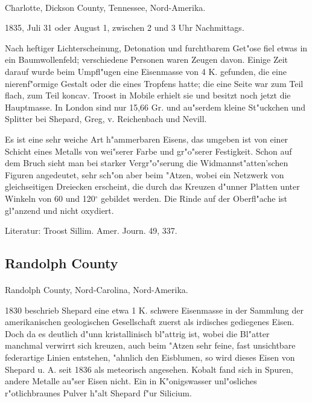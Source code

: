 \documentclass[a4paper, 11pt, oneside]{article}
\begin{document}
\paragraph{}
Charlotte, Dickson County, Tennessee, Nord-Amerika.

1835, Juli 31 oder August 1, zwischen 2 und 3 Uhr Nachmittags.

Nach heftiger Lichterscheinung, Detonation und furchtbarem Get"ose fiel etwas in ein Baumwollenfeld; verschiedene Personen waren Zeugen davon. Einige Zeit darauf wurde beim Umpfl"ugen eine Eisenmasse von 4 K. gefunden, die eine nierenf"ormige Gestalt oder die eines Tropfens hatte; die eine Seite war zum Teil flach, zum Teil koncav. Troost in Mobile erhielt sie und besitzt noch jetzt die Hauptmasse. In London sind nur 15,66 Gr. und au"serdem kleine St"uckchen und Splitter bei Shepard, Greg, v. Reichenbach und Nevill.

Es ist eine sehr weiche Art h"ammerbaren Eisens, das umgeben ist von einer Schicht eines Metalls von wei"serer Farbe und gr"o"serer Festigkeit. Schon auf dem Bruch sieht man bei starker Vergr"o"serung die Widmannst"atten'schen Figuren angedeutet, sehr sch"on aber beim "Atzen, wobei ein Netzwerk von gleichseitigen Dreiecken erscheint, die durch das Kreuzen d"unner Platten unter Winkeln von 60 und 120$^\circ$ gebildet werden. Die Rinde auf der Oberfl"ache ist gl"anzend und nicht oxydiert.

\footnotesize
Literatur: Troost Sillim. Amer. Journ. 49, 337.

\subsection{Randolph County}
\normalsize
\paragraph{}
Randolph County, Nord-Carolina, Nord-Amerika.

1830 beschrieb Shepard eine etwa 1 K. schwere Eisenmasse in der Sammlung der amerikanischen geologischen Gesellschaft zuerst als irdisches gediegenes Eisen. Doch da es deutlich d"unn kristallinisch bl"attrig ist, wobei die Bl"atter manchmal verwirrt sich kreuzen, auch beim "Atzen sehr feine, fast unsichtbare federartige Linien entstehen, "ahnlich den Eisblumen, so wird dieses Eisen von Shepard u. A. seit 1836 als meteorisch angesehen. Kobalt fand sich in Spuren, andere Metalle au"ser Eisen nicht. Ein in K"onigswasser unl"osliches r"otlichbraunes Pulver h"alt Shepard f"ur Silicium.
\end{document}
